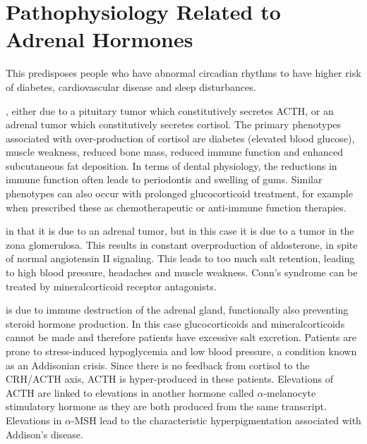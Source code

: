 \documentclass{tufte-handout}
\begin{document}
\section{Pathophysiology Related to Adrenal Hormones}

  This predisposes people who have abnormal circadian rhythms to have higher risk of diabetes, cardiovascular disease and sleep disturbances\cite{Scheer2009,Pan2011}.  

, either due to a pituitary tumor which constitutively secretes ACTH, or an adrenal tumor which constitutively secretes cortisol.  The primary phenotypes associated with over-production of cortisol are diabetes (elevated blood glucose), muscle weakness, reduced bone mass, reduced immune function and enhanced subcutaneous fat deposition.  In terms of dental physiology, the reductions in immune function often leads to periodontis and swelling of gums. Similar phenotypes can also occur with prolonged glucocorticoid treatment, for example when prescribed these as chemotherapeutic or anti-immune function therapies.

 in that it is due to an adrenal tumor, but in this case it is due to a tumor in the zona glomerulosa.  This results in constant overproduction of aldosterone, in spite of normal angiotensin II signaling.  This leads to too much salt retention, leading to high blood pressure, headaches and muscle weakness.  Conn's syndrome can be treated by mineralcorticoid receptor antagonists.

 is due to immune destruction of the adrenal gland, functionally also preventing steroid hormone production.  In this case glucocorticoids and mineralcorticoids cannot be made and therefore patients have excessive salt excretion.  Patients are prone to stress-induced hypoglycemia and low blood pressure, a condition known as an Addisonian crisis.  Since there is no feedback from cortisol to the CRH/ACTH axis, ACTH is hyper-produced in these patients.  Elevations of ACTH are linked to elevations in another hormone called $\alpha$-melanocyte stimulatory hormone as they are both produced from the same transcript.  Elevations in $\alpha$-MSH lead to the characteristic hyperpigmentation associated with Addison's disease. 
\end{document}
